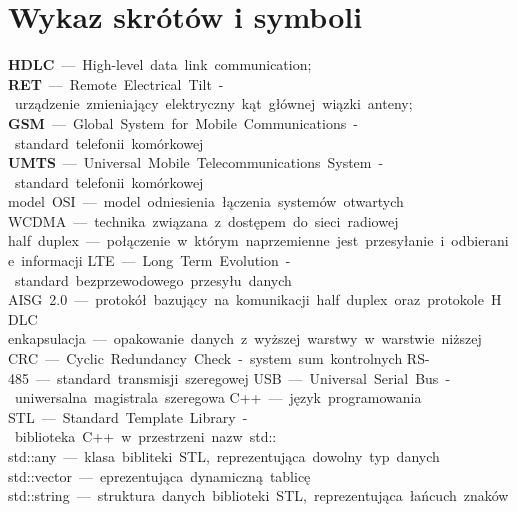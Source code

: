\chapter*{Wykaz skrótów i symboli}
\noindent
\textbf{HDLC} --- High-level data link communication;\newline
\textbf{RET} --- Remote Electrical Tilt - urządzenie zmieniający elektryczny kąt głównej wiązki anteny;\newline
\textbf{GSM} --- Global System for Mobile Communications - standard telefonii komórkowej\newline
\textbf{UMTS} --- Universal Mobile Telecommunications System - standard telefonii komórkowej\newline
model OSI --- model odniesienia łączenia systemów otwartych\newline
WCDMA --- technika związana z dostępem do sieci radiowej\newline
half duplex --- połączenie w którym naprzemienne jest przesyłanie i odbieranie informacji\newline
LTE --- Long Term Evolution - standard bezprzewodowego przesyłu danych\newline
AISG 2.0 --- protokół bazujący na komunikacji half duplex oraz protokole HDLC\newline
enkapsulacja --- opakowanie danych z wyższej warstwy w warstwie niższej\newline
CRC --- Cyclic Redundancy Check - system sum kontrolnych\newline
RS-485 --- standard transmisji szeregowej\newline
USB --- Universal Serial Bus - uniwersalna magistrala szeregowa\newline
C++ --- język programowania\newline
STL --- Standard Template Library - biblioteka C++ w przestrzeni nazw std::\newline
std::any --- klasa bibliteki STL, reprezentująca dowolny typ danych\newline
std::vector --- eprezentująca dynamiczną tablicę\newline
std::string --- struktura danych biblioteki STL, reprezentująca łańcuch znaków\newline

\let\cleardoublepage\clearpage
